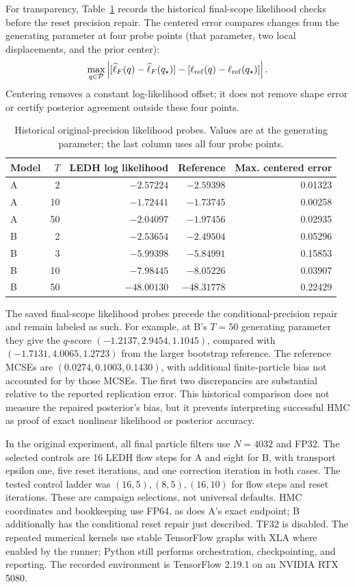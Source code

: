 For transparency, Table~\ref{tab:bf-structural-ab-likelihoods} records the
historical final-scope likelihood checks before the reset precision repair.
The centered error compares changes from the generating parameter at four
probe points (that parameter, two local displacements, and the prior center):
\[
 \max_{q\in\mathcal P}\left|
 [\widehat\ell_F(q)-\widehat\ell_F(q_\star)]
 -[\ell_{\rm ref}(q)-\ell_{\rm ref}(q_\star)]\right|.
\]
Centering removes a constant log-likelihood offset; it does not remove shape
error or certify posterior agreement outside these four points.
\begin{table}[htbp]
\centering\small
\caption{Historical original-precision likelihood probes.  Values are at
the generating parameter; the last column uses all four probe points.}
\label{tab:bf-structural-ab-likelihoods}
\begin{tabular}{lrrrr}
\toprule
Model & $T$ & LEDH log likelihood & Reference & Max. centered error\\
\midrule
A & 2  & $-2.57224$ & $-2.59398$ & 0.01323\\
A & 10 & $-1.72441$ & $-1.73745$ & 0.00258\\
A & 50 & $-2.04097$ & $-1.97456$ & 0.02935\\
B & 2  & $-2.53654$ & $-2.49504$ & 0.05296\\
B & 3  & $-5.99398$ & $-5.84991$ & 0.15853\\
B & 10 & $-7.98445$ & $-8.05226$ & 0.03907\\
B & 50 & $-48.00130$ & $-48.31778$ & 0.22429\\
\bottomrule
\end{tabular}
\end{table}

The saved final-scope likelihood probes precede the conditional-precision
repair and remain labeled as such.  For example, at B's $T=50$ generating
parameter they give the $q$-score $(-1.2137,2.9454,1.1045)$, compared with
$(-1.7131,4.0065,1.2723)$ from the larger bootstrap reference.  The reference
MCSEs are $(0.0274,0.1003,0.1430)$, with additional finite-particle bias not
accounted for by those MCSEs.  The first two discrepancies are substantial
relative to the reported replication error.  This historical comparison
does not measure the repaired posterior's bias, but it prevents interpreting
successful HMC as proof of exact nonlinear likelihood or posterior accuracy.

In the original experiment, all final particle filters use $N=4032$ and FP32.
The selected controls are
16 LEDH flow steps for A and eight for B, with transport epsilon one, five
reset iterations, and one correction iteration in both cases.  The tested
control ladder was $(16,5),(8,5),(16,10)$ for flow steps and reset iterations.
These are campaign selections, not universal defaults.  HMC coordinates and
bookkeeping use FP64, as does A's exact endpoint; B additionally has the
conditional reset repair just described.  TF32 is disabled.  The repeated
numerical kernels use stable TensorFlow graphs with XLA where enabled by the
runner; Python still performs orchestration, checkpointing, and reporting.
The recorded environment is TensorFlow 2.19.1 on an NVIDIA RTX 5080.

